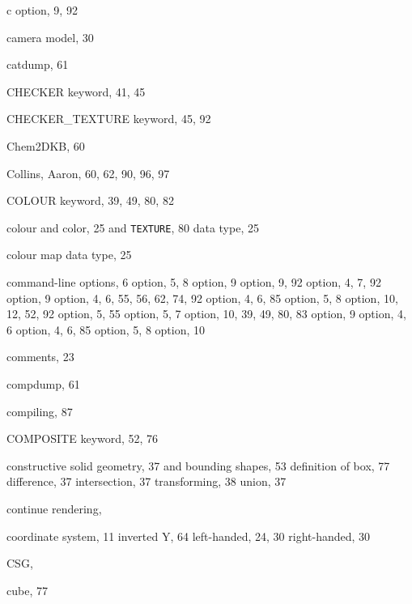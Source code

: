 \begin{theindex}
  \item {\ptt c} option, 9, 92
  \item camera model, 30
  \item {\ptt catdump}, 61
  \item {\ptt CHECKER} keyword, 41, 45
  \item {\ptt CHECKER\_TEXTURE} keyword, 45, 92
  \item {\ptt Chem2DKB}, 60
  \item Collins, Aaron, 60, 62, 90, 96, 97
  \item {\ptt COLOUR} keyword, 39, 49, 80, 82
  \item colour
    \subitem and color, 25
    \subitem and {\tt TEXTURE}, 80
    \subitem data type, 25
  \item colour map data type, 25
  \item command-line options, 6
     option, 5, 8
     option, 9
     option, 9, 92
     option, 4, 7, 92
     option, 9
     option, 4, 6, 55, 56, 62, 74, 92
     option, 4, 6, 85
     option, 5, 8
     option, 10, 12, 52, 92
     option, 5, 55
     option, 5, 7
     option, 10, 39, 49, 80, 83
     option, 9
     option, 4, 6
     option, 4, 6, 85
     option, 5, 8
     option, 10
  \item comments, 23
  \item {\ptt compdump}, 61
  \item compiling, 87
  \item {\ptt COMPOSITE} keyword, 52, 76
  \item constructive solid geometry, 37
    \subitem and bounding shapes, 53
    \subitem definition of box, 77
    \subitem difference, 37
    \subitem intersection, 37
    \subitem transforming, 38
    \subitem union, 37
  \item continue rendering, 
  \item coordinate system, 11
    \subitem inverted Y, 64
    \subitem left-handed, 24, 30
    \subitem right-handed, 30
  \item CSG, 
  \item cube, 77

  \indexspace


\end{theindex}
